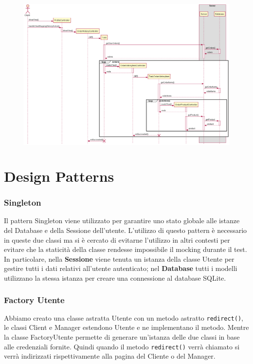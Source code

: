 \documentclass[12pt, a4paper]{report}
\begin{document}
\begin{figure}[H]
  \centering
  \includegraphics[width=\textwidth]{shopping_history_sequence.png}
\end{figure}

\newpage

\section{Design Patterns}

\subsubsection{Singleton}	

Il pattern Singleton viene utilizzato per garantire uno stato globale alle istanze del Database e della Sessione dell'utente.
L'utilizzo di questo pattern è necessario in queste due classi ma si è cercato di evitarne l'utilizzo in altri contesti per evitare che la staticità della classe rendesse impossibile il mocking durante il test.
In particolare, nella \textbf{Sessione} viene tenuta un istanza della classe Utente per gestire tutti i dati relativi all'utente autenticato; nel \textbf{Database} tutti i modelli utilizzano la stessa istanza per creare una connessione al database SQLite. 

\subsubsection{Factory Utente}

Abbiamo creato una classe astratta Utente con un metodo astratto \verb|redirect()|,
le classi Client e Manager estendono Utente e ne implementano il metodo.
Mentre la classe FactoryUtente permette di generare un'istanza delle due classi
in base alle credenziali fornite. Quindi quando il metodo \verb|redirect()|
verrà chiamato si verrà indirizzati rispettivamente alla pagina del Cliente o
del Manager.
\end{document}
